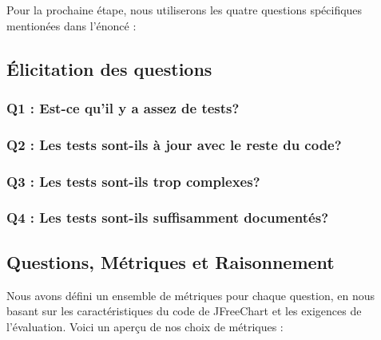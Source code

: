 \documentclass{proc}
\begin{document}
\vspace{10px}

Pour la prochaine étape, nous utiliserons les quatre questions spécifiques mentionées dans l'énoncé :

\vspace{-20px}

\subsection{Élicitation des questions}

\subsubsection*{Q1 : Est-ce qu'il y a assez de tests?}
\subsubsection*{Q2 : Les tests sont-ils à jour avec le reste du code?}
\subsubsection*{Q3 : Les tests sont-ils trop complexes?}
\subsubsection*{Q4 : Les tests sont-ils suffisamment documentés?\\}

\subsection{Questions, Métriques et Raisonnement}
Nous avons défini un ensemble de métriques pour chaque question, en nous basant sur les caractéristiques du code de JFreeChart et les exigences de l'évaluation. Voici un aperçu de nos choix de métriques :
\end{document}
